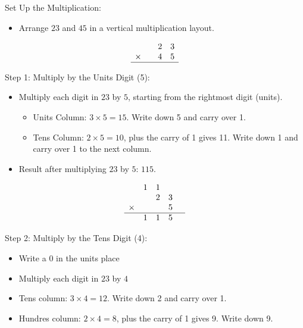 \vspace{\baselineskip}\par
Set Up the Multiplication:
  \begin{itemize}
    \item Arrange \( 23 \) and \( 45 \) in a vertical multiplication layout.
   \end{itemize}
\[
\begin{array}{rcccc}
    & & 2 & 3 \\ %
  \times & & 4 & 5 \\ %
  \hline
\end{array}
\]

\vspace{\baselineskip}\par
Step 1: Multiply by the Units Digit (5):
  \begin{itemize}
   \item Multiply each digit in \( 23 \) by \( 5 \), starting from the rightmost digit (units).
    \begin{itemize}
      \item Units Column: \( 3 \times 5 = 15 \). Write down 5 and carry over 1.
   \item Tens Column: \( 2 \times 5 = 10 \), plus the carry of 1 gives 11. Write down 1 and carry over 1 to the next column.
   \end{itemize}
   \item Result after multiplying \( 23 \) by \( 5 \): \( 115 \).

\end{itemize}
\[
\begin{array}{rccccc}
   & 1 & 1 &  &  \\ %
   & & 2 & 3 \\ %
  \times & & & 5 \\ %
  \hline
  & 1 & 1 & 5 &  \\ %
\end{array}
\]

\vspace{\baselineskip}\par
Step 2: Multiply by the Tens Digit (4):
  \begin{itemize}
  \item Write a 0 in the units place
   \item Multiply each digit in \( 23 \) by \( 4 \)
   \item Tens column: \( 3 \times 4 = 12 \). Write down 2 and carry over 1.
   \item Hundres column: \( 2 \times 4 = 8 \), plus the carry of 1 gives 9. Write down 9.
  \end{itemize}

